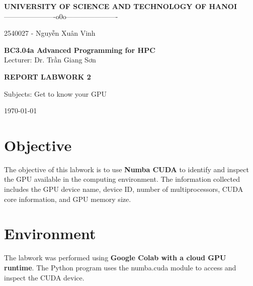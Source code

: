 \documentclass[11pt]{article}
\begin{document}
\begin{center}

{\Large \textbf{UNIVERSITY OF SCIENCE AND TECHNOLOGY OF HANOI}}\\
\vspace{0.3cm}
----------------------o0o----------------------\\

\vspace{4cm}

{\large
\centerline{2540027 - Nguyễn Xuân Vinh}
}

\vspace{4cm}

{\Huge \textbf{BC3.04a Advanced Programming for HPC}}\\
\vspace{0.5cm}
Lecturer: Dr. Trần Giang Sơn

\vspace{4cm}

{\Large \textbf{REPORT LABWORK 2}}\\

\vspace{0.5cm}

{\large
Subjects: Get to know your GPU
}

\vspace{4cm}
\today
\end{center}

\newpage

\newpage

\tableofcontents

\newpage

\section{Objective}

The objective of this labwork is to use \textbf{Numba CUDA} to identify and inspect the GPU available in the computing environment. The information collected includes the GPU device name, device ID, number of multiprocessors, CUDA core information, and GPU memory size.

\section{Environment}

The labwork was performed using \textbf{Google Colab with a cloud GPU runtime}. The Python program uses the numba.cuda module to access and inspect the CUDA device.
\end{document}

